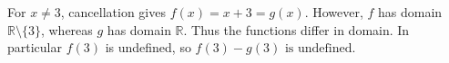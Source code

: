 For $x\ne3$, cancellation gives $f(x)=x+3=g(x)$. However, $f$ has domain $\mathbb R\setminus\{3\}$, whereas $g$ has domain $\mathbb R$. Thus the functions differ in domain. In particular $f(3)$ is undefined, so $\boxed{f(3)-g(3)\text{ is undefined}}$.
